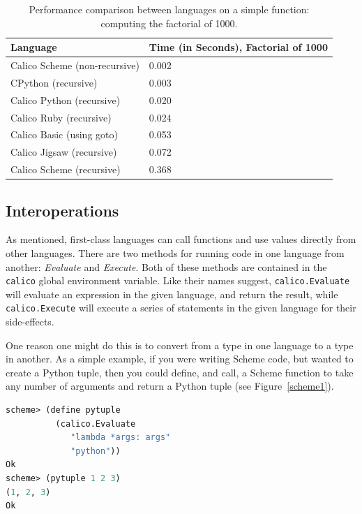 \documentclass[preprint]{sigplanconf}
\begin{document}
\begin{table}[h!]\footnotesize
  \centering
  \begin{tabular}{ l | l }
    \hline                        
    \textbf{Language} & \textbf{Time (in Seconds), Factorial of 1000} \\
    \hline                        
    Calico Scheme (non-recursive) & 0.002 \\
    CPython (recursive)           & 0.003 \\
    Calico Python (recursive)     & 0.020 \\
    Calico Ruby (recursive)       & 0.024 \\
    Calico Basic (using goto)     & 0.053 \\
    Calico Jigsaw (recursive)     & 0.072 \\
    Calico Scheme (recursive)     & 0.368 \\
  \end{tabular}
  \caption{Performance comparison between languages on a simple
    function: computing the factorial of 1000.}
  \label{performance}
\end{table}

\subsection{Interoperations}

As mentioned, first-class languages can call functions and use values
directly from other languages. There are two methods for running code
in one language from another: \textit{Evaluate} and
\textit{Execute}. Both of these methods are contained in the
\texttt{calico} global environment variable. Like their names suggest,
\texttt{calico.Evaluate} will evaluate an expression in the given
language, and return the result, while \texttt{calico.Execute} will
execute a series of statements in the given language for their
side-effects.

One reason one might do this is to convert from a type in one language
to a type in another. As a simple example, if you were writing Scheme
code, but wanted to create a Python tuple, then you could define, and
call, a Scheme function to take any number of arguments and return a
Python tuple (see Figure~\ref{scheme1}).

\begin{lstlisting}[language=Lisp, morekeywords={define}, caption={Defining a function \texttt{pytuple} in 
      Calico Scheme that directly uses Calico Python's lambda to construct a Python tuple. Notice     
      that in line 7 that the tuple's displayed representation reflects the style
      from Python rather than Scheme's.}, label={scheme1}]
scheme> (define pytuple 
          (calico.Evaluate 
             "lambda *args: args" 
             "python"))
Ok
scheme> (pytuple 1 2 3)
(1, 2, 3)
Ok
\end{lstlisting}
\end{document}
